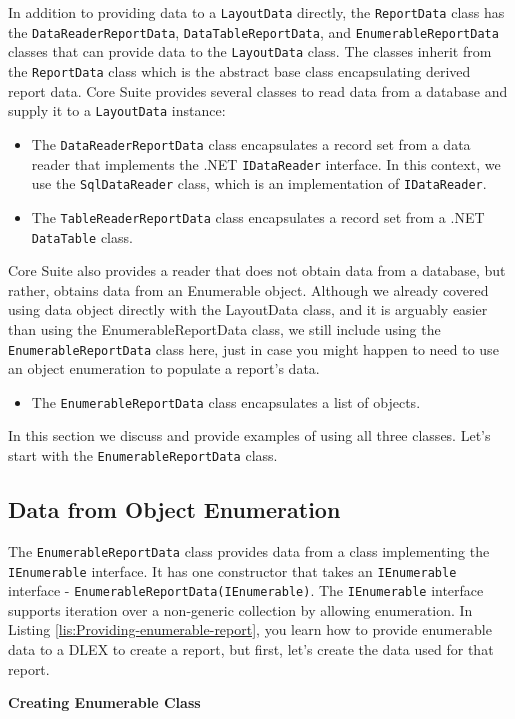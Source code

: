 \documentclass[american,letterpaper]{tufte-book}
\numberwithin{equation}{section}
\numberwithin{figure}{section}
\begin{document}
{{In addition to providing data to a \texttt{LayoutData} directly, the \texttt{ReportData}
class has the \texttt{DataReaderReportData}, \texttt{DataTableReportData}, and \texttt{EnumerableReportData}
classes that can provide data to the \texttt{LayoutData} class. The classes
inherit from the \texttt{ReportData} class which is the abstract base class
encapsulating derived report data. Core Suite provides several classes
to read data from a database and supply it to a \texttt{LayoutData}
instance:
\begin{itemize}
\item The \texttt{DataReaderReportData} class encapsulates a record set
from a data reader that implements the .NET \texttt{IDataReader} interface.
In this context, we use the \texttt{SqlDataReader} class, which is
an implementation of \texttt{IDataReader}.
\item The \texttt{TableReaderReportData} class encapsulates a record set
from a .NET \texttt{DataTable} class.
\end{itemize}
Core Suite also provides a reader that does not obtain data from a
database, but rather, obtains data from an Enumerable object. Although
we already covered using data object directly with the LayoutData
class, and it is arguably easier than using the EnumerableReportData
class, we still include using the \texttt{EnumerableReportData} class here, just in case you might happen to need to use an object
enumeration to populate a report's data.
\begin{itemize}
\item The \texttt{EnumerableReportData} class encapsulates a list of objects.
\end{itemize}
In this section we discuss and provide examples of using all three
classes. Let's start with the \texttt{EnumerableReportData} class.

\subsection{Data from Object Enumeration}

The \texttt{EnumerableReportData} class provides data from a class
implementing the \texttt{IEnumerable} interface. It has one constructor
that takes an \texttt{IEnumerable} interface - \texttt{EnumerableReportData(IEnumerable)}.
The \texttt{IEnumerable} interface supports iteration over a non-generic
collection by allowing enumeration. In Listing \ref{lis:Providing-enumerable-report},
you learn how to provide enumerable data to a DLEX to create a report,
but first, let's create the data used for that report.
\noindent\begin{flushleft}
\textbf{Creating Enumerable Class}
\par\end{flushleft}

}}
\end{document}
